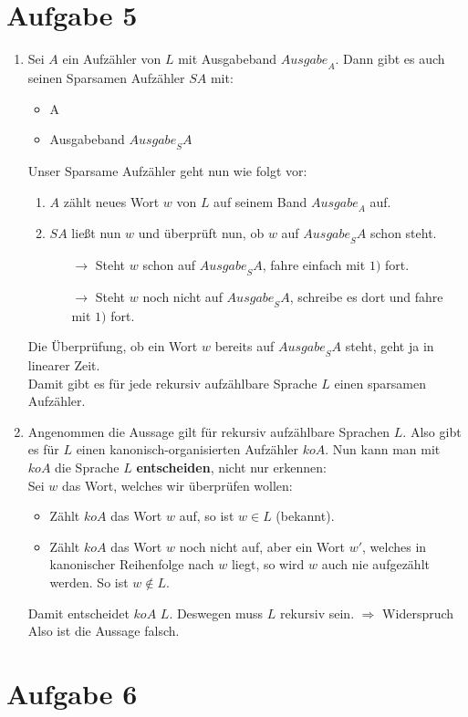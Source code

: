 \documentclass[a4paper,11pt]{scrartcl}
\begin{document}
	
	\section*{Aufgabe 5}
	\begin{enumerate}[label=(\alph*)]
	\item	Sei $A$ ein Aufzähler von $L$ mit Ausgabeband ${Ausgabe}_A$. Dann gibt es auch seinen Sparsamen Aufzähler $SA$ mit:
			\begin{itemize}
			\item A
			\item Ausgabeband ${Ausgabe}_SA$
			\end{itemize}
			Unser Sparsame Aufzähler geht nun wie folgt vor:
			\begin{enumerate}[label=\arabic*)]
			\item $A$ zählt neues Wort $w$ von $L$ auf seinem Band ${Ausgabe}_A$ auf.
			\item $SA$ ließt nun $w$ und überprüft nun, ob $w$ auf ${Ausgabe}_SA$ schon steht.
				\begin{itemize}
				\item[$\rightarrow$] Steht $w$ schon auf ${Ausgabe}_SA$, fahre einfach mit $1)$ fort.
				\item[$\rightarrow$] Steht $w$ noch nicht auf ${Ausgabe}_SA$, schreibe es dort und fahre mit $1)$ fort.
				\end{itemize}
			\end{enumerate}
			Die Überprüfung, ob ein Wort $w$ bereits auf ${Ausgabe}_SA$ steht, geht ja in linearer Zeit.\\
			Damit gibt es für jede rekursiv aufzählbare Sprache $L$ einen sparsamen Aufzähler.
	
	\item	Angenommen die Aussage gilt für rekursiv aufzählbare Sprachen $L$. Also gibt es für $L$ einen kanonisch-organisierten Aufzähler $koA$. Nun kann man mit $koA$ die Sprache $L$ \textbf{entscheiden}, nicht nur erkennen:\\
			Sei $w$ das Wort, welches wir überprüfen wollen:
			\begin{itemize}
			\item Zählt $koA$ das Wort $w$ auf, so ist $w \in L$ (bekannt).
			\item Zählt $koA$ das Wort $w$ noch nicht auf, aber ein Wort $w'$, welches in kanonischer Reihenfolge nach $w$ liegt, so wird $w$ auch nie aufgezählt werden. So ist $w \not\in L$.
			\end{itemize}
			Damit entscheidet $koA$ $L$. Deswegen muss $L$ rekursiv sein. $\Rightarrow$ Widerspruch \\
			Also ist die Aussage falsch.
	\end{enumerate}
	
	
	\section*{Aufgabe 6}
\end{document}
